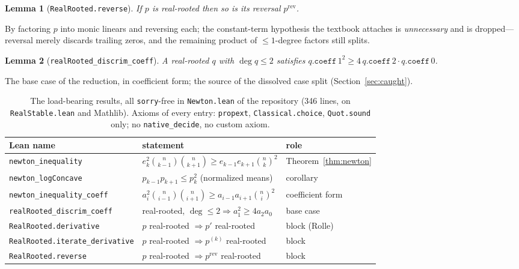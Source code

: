 \documentclass[11pt]{article}
\newtheorem{lemma}{Lemma}
\newcommand{\lean}[1]{\texttt{#1}}
\begin{document}
\begin{lemma}[\lean{RealRooted.reverse}]
If $p$ is real-rooted then so is its reversal $p^{\mathrm{rev}}$.
\end{lemma}
By factoring $p$ into monic linears and reversing each; the constant-term hypothesis the textbook
attaches is \emph{unnecessary} and is dropped---reversal merely discards trailing zeros, and the
remaining product of $\le1$-degree factors still splits.

\begin{lemma}[\lean{realRooted\_discrim\_coeff}]
A real-rooted $q$ with $\deg q\le2$ satisfies $q.\mathtt{coeff}\,1^2\ge4\,q.\mathtt{coeff}\,2\cdot
q.\mathtt{coeff}\,0$.
\end{lemma}
The base case of the reduction, in coefficient form; the source of the dissolved case split
(Section~\ref{sec:caught}).

\begin{table}[h]
\centering\small
{}
\begin{tabular}{@{}lll@{}}
\toprule
\rowcolor{ggteal!18} Lean name & statement & role \\
\midrule
\lean{newton\_inequality} & $e_k^2\binom{n}{k-1}\binom{n}{k+1}\ge e_{k-1}e_{k+1}\binom{n}{k}^2$ & Theorem~\ref{thm:newton} \\
\lean{newton\_logConcave} & $p_{k-1}p_{k+1}\le p_k^2$ (normalized means) & corollary \\
\lean{newton\_inequality\_coeff} & $a_i^2\binom{n}{i-1}\binom{n}{i+1}\ge a_{i-1}a_{i+1}\binom{n}{i}^2$ & coefficient form \\
\lean{realRooted\_discrim\_coeff} & real-rooted, $\deg\le2\Rightarrow a_1^2\ge4a_2a_0$ & base case \\
\lean{RealRooted.derivative} & $p$ real-rooted $\Rightarrow p'$ real-rooted & block (Rolle) \\
\lean{RealRooted.iterate\_derivative} & $p$ real-rooted $\Rightarrow p^{(k)}$ real-rooted & block \\
\lean{RealRooted.reverse} & $p$ real-rooted $\Rightarrow p^{\mathrm{rev}}$ real-rooted & block \\
\bottomrule
\end{tabular}
\caption{The load-bearing results, all \lean{sorry}-free in \lean{Newton.lean} of the repository
(346 lines, on \lean{RealStable.lean} and Mathlib). Axioms of every entry: \lean{propext},
\lean{Classical.choice}, \lean{Quot.sound} only; no \lean{native\_decide}, no custom axiom.}
\label{tab:inventory}
\end{table}
\end{document}
